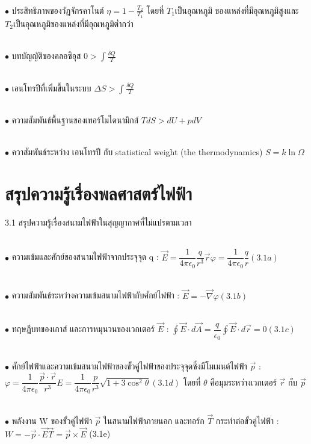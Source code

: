 \documentclass[a4paper,12pt]{article}
\begin{document}
~\\ $\bullet$ ประสิทธิภาพของวัฏจักรคาโนต์
$\eta=1-\displaystyle{\frac{T_2}{T_1}}$
โดยที่ $T_1$เป็นอุณหภูมิ ของแหล่งที่มีอุณหภูมิสูงและ $T_2$เป็นอุณหภูมิของแหล่งที่มีอุณหภูมิต่ำกว่า

~\\ $\bullet$ บทบัญญัติของคลอซิอุส
$0>\int \displaystyle{\frac{\delta Q}{T}}$

~\\ $\bullet$ เอนโทรปีที่เพิ่มขึ้นในระบบ
$\Delta S>\int\displaystyle{\frac{\delta Q}T{}}$

~\\ $\bullet$ ความสัมพันธ์พื้นฐานของเทอร์โมไดนามิกส์
$TdS>dU+pdV$

~\\ $\bullet$ ควาสัมพันธ์ระหว่าง เอนโทรปี กับ statistical weight (the thermodynamics)
$S=k\ln\Omega$

\pagebreak

	\section*{สรุปความรู้เรื่องพลศาสตร์ไฟฟ้า}
3.1 สรุปความรู้เรื่องสนามไฟฟ้าในสุญญากาศที่ไม่แปรตามเวลา

~\\ $\bullet$    ความเข้มและศักย์ของสนามไฟฟ้าจากประจุจุด q :
$\vec{E} = \dfrac{1}{4\pi\epsilon_{0}}\dfrac{q}{r^{3}}\vec{r}       \varphi = \dfrac{1}{4\pi\epsilon_{0}}\dfrac{q}{r}               (3.1a)$

~\\ $\bullet$    ความสัมพันธ์ระหว่างความเข้มสนามไฟฟ้ากับศักย์ไฟฟ้า :
$\vec{E} = -\vec{\nabla}\varphi                   (3.1b)$

~\\ $\bullet$    ทฤษฎีบทของเกาส์ และการหมุนวนของเวกเตอร์ $\vec{E}$ :
$\displaystyle \oint \vec{E}\cdot d\vec{A} = \dfrac{q}{\epsilon_{0}}            \displaystyle \oint \vec{E}\cdot d\vec{r} = 0                          (3.1c)$

~\\ $\bullet$    ศักย์ไฟฟ้าและความเข้มสนามไฟฟ้าของขั้วคู่ไฟฟ้าของประจุจุดซึ่งมีโมเมนต์ไฟฟ้า $\vec{p}$ :
$\varphi = \dfrac{1}{4\pi\epsilon_{0}}\dfrac{\vec{p}\cdot\vec{r}}{r^{3}}            E= \dfrac{1}{4\pi\epsilon_{0}}\dfrac{p}{r^{3}}\sqrt{1+3\cos^{2}\theta}                  (3.1d)$
โดยที่ $\theta$ คือมุมระหว่างเวกเตอร์ $\vec{r}$ กับ $\vec{p}$

~\\ $\bullet$    พลังงาน  W  ของขั้วคู่ไฟฟ้า  $\vec{p}$ ในสนามไฟฟ้าภายนอก และทอร์ก $\vec{T}$ กระทำต่อขั้วคู่ไฟฟ้า :
$W=-\vec{p}\cdot\vec{E}                  \vec{T} = \vec{p}\times\vec{E}$              (3.1e)
\end{document}
